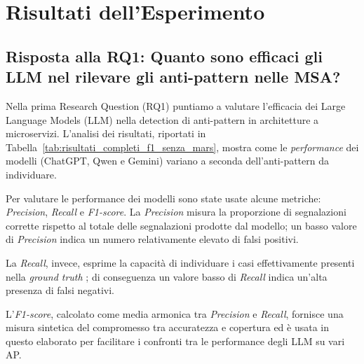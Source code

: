 \chapter{Risultati dell'Esperimento}



    


\section{Risposta alla RQ1: Quanto sono efficaci gli LLM nel rilevare gli anti-pattern nelle MSA?}

Nella prima Research Question (RQ1) puntiamo a valutare l'efficacia dei Large Language Models (LLM) nella detection di anti-pattern in architetture a microservizi. L'analisi dei risultati, riportati in Tabella~\ref{tab:risultati_completi_f1_senza_mars}, mostra come le \textit{performance} dei modelli (ChatGPT, Qwen e Gemini) variano a seconda dell'anti-pattern da individuare. 

Per valutare le performance dei modelli sono state usate alcune metriche: \textit{Precision}, \textit{Recall} e \textit{F1-score}. La \textit{Precision} misura la proporzione di segnalazioni corrette rispetto al totale delle segnalazioni prodotte dal modello; un basso valore di \textit{Precision} indica un numero relativamente elevato di falsi positivi. 

La \textit{Recall}, invece, esprime la capacità di individuare i casi effettivamente presenti nella \textit{ground truth} \cite{metriche}; di conseguenza un valore basso di \textit{Recall} indica un'alta presenza di falsi negativi. 

L'\textit{F1-score}, calcolato come media armonica tra \textit{Precision} e \textit{Recall}, fornisce una misura sintetica del compromesso tra accuratezza e copertura \cite{metriche} ed è usata in questo elaborato per facilitare i confronti tra le performance degli LLM su vari AP.

